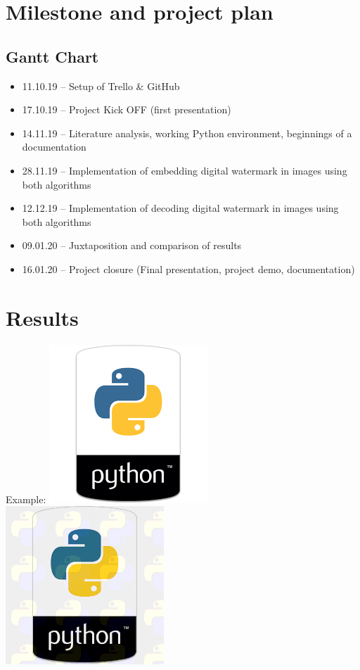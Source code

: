 \documentclass{article}
\begin{document}
\section{Milestone and project plan}
	\subsection{Gantt Chart}
	
	\begin{itemize}
	

	\item 11.10.19 – Setup of Trello & GitHub
	\item 17.10.19 – Project Kick OFF (first presentation)
	\item 14.11.19 – Literature analysis, working Python environment, beginnings of a documentation
	\item 28.11.19 – Implementation of embedding digital watermark in images using both algorithms
	\item 12.12.19 – Implementation of decoding digital watermark in images using both algorithms
	\item 09.01.20 – Juxtaposition and comparison of results
	\item 16.01.20 – Project closure (Final presentation, project demo, documentation)
	\end{itemize}
	
	\subsection{}
\section{Results}

		
	Example:
	\includegraphics{python.png}
	\includegraphics{watermarked_python.png}
	
\end{document}

